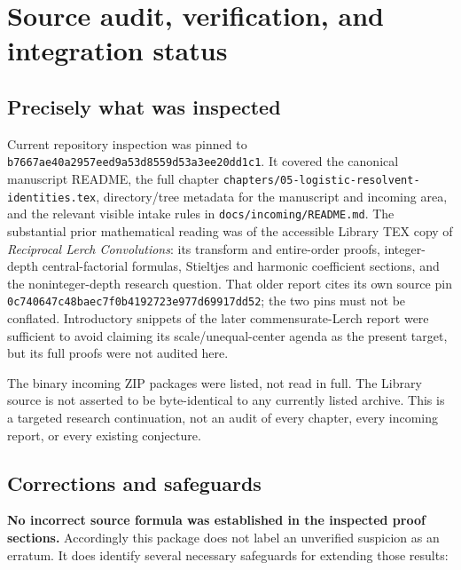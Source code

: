 \documentclass[11pt,letterpaper]{article}
\numberwithin{equation}{section}
\theoremstyle{definition}\newtheorem{definition}[theorem]{Definition}
\theoremstyle{remark}\newtheorem{remark}[theorem]{Remark}
\newcommand{\src}[1]{\nolinkurl{#1}}
\newcommand{\pin}{\src{b7667ae40a2957eed9a53d8559d53a3ee20dd1c1}}
\begin{document}
\section{Source audit, verification, and integration status}
\label{cdl:sec:audit}

\subsection{Precisely what was inspected}
Current repository inspection was pinned to \pin. It covered the
canonical manuscript README, the full chapter
\src{chapters/05-logistic-resolvent-identities.tex}, directory/tree
metadata for the manuscript and incoming area, and the relevant visible
intake rules in \src{docs/incoming/README.md}. The substantial prior
mathematical reading was of the accessible Library TEX copy of
\emph{Reciprocal Lerch Convolutions}: its transform and entire-order
proofs, integer-depth central-factorial formulas, Stieltjes and harmonic
coefficient sections, and the noninteger-depth research question.
That older report cites its own source pin
\src{0c740647c48baec7f0b4192723e977d69917dd52}; the two pins must not
be conflated. Introductory snippets of the later commensurate-Lerch
report were sufficient to avoid claiming its scale/unequal-center agenda
as the present target, but its full proofs were not audited here.

The binary incoming ZIP packages were listed, not read in full. The
Library source is not asserted to be byte-identical to any currently
listed archive. This is a targeted research continuation, not an audit
of every chapter, every incoming report, or every existing conjecture.

\subsection{Corrections and safeguards}
\textbf{No incorrect source formula was established in the inspected
proof sections.} Accordingly this package does not label an unverified
suspicion as an erratum. It does identify several necessary safeguards
for extending those results:
\end{document}
